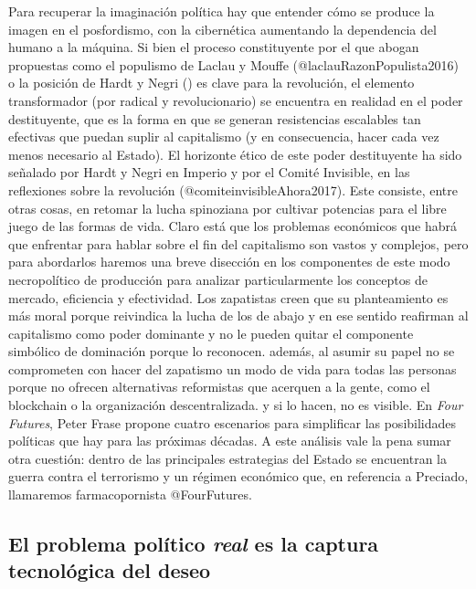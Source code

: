 \documentclass[
]{article}
\begin{document}
Para recuperar la imaginación política hay que entender cómo se produce
la imagen en el posfordismo, con la cibernética aumentando la
dependencia del humano a la máquina. Si bien el proceso constituyente
por el que abogan propuestas como el populismo de Laclau y Mouffe
(@laclauRazonPopulista2016) o la posición de Hardt y Negri () es clave
para la revolución, el elemento transformador (por radical y
revolucionario) se encuentra en realidad en el poder destituyente, que
es la forma en que se generan resistencias escalables tan efectivas que
puedan suplir al capitalismo (y en consecuencia, hacer cada vez menos
necesario al Estado). El horizonte ético de este poder destituyente ha
sido señalado por Hardt y Negri en Imperio y por el Comité Invisible, en
las reflexiones sobre la revolución (@comiteinvisibleAhora2017). Este
consiste, entre otras cosas, en retomar la lucha spinoziana por cultivar
potencias para el libre juego de las formas de vida. Claro está que los
problemas económicos que habrá que enfrentar para hablar sobre el fin
del capitalismo son vastos y complejos, pero para abordarlos haremos una
breve disección en los componentes de este modo necropolítico de
producción para analizar particularmente los conceptos de mercado,
eficiencia y efectividad. Los zapatistas creen que su planteamiento es
más moral porque reivindica la lucha de los de abajo y en ese sentido
reafirman al capitalismo como poder dominante y no le pueden quitar el
componente simbólico de dominación porque lo reconocen. además, al
asumir su papel no se comprometen con hacer del zapatismo un modo de
vida para todas las personas porque no ofrecen alternativas reformistas
que acerquen a la gente, como el blockchain o la organización
descentralizada. y si lo hacen, no es visible. En \emph{Four Futures},
Peter Frase propone cuatro escenarios para simplificar las posibilidades
políticas que hay para las próximas décadas. A este análisis vale la
pena sumar otra cuestión: dentro de las principales estrategias del
Estado se encuentran la guerra contra el terrorismo y un régimen
económico que, en referencia a Preciado, llamaremos farmacopornista
@FourFutures.

\hypertarget{el-problema-poluxedtico-real-es-la-captura-tecnoluxf3gica-del-deseo}{%
\subsection{\texorpdfstring{El problema político \emph{real} es la
captura tecnológica del
deseo}{El problema político real es la captura tecnológica del deseo}}\label{el-problema-poluxedtico-real-es-la-captura-tecnoluxf3gica-del-deseo}}
\end{document}
